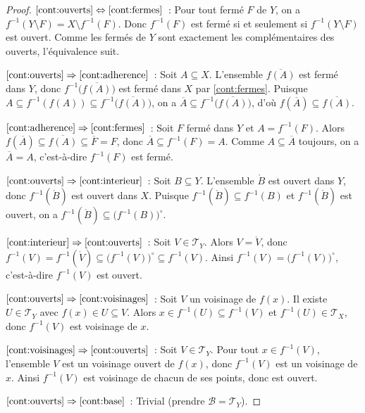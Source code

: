 \documentclass[12pt,a4paper,openany]{book}
\theoremstyle{definition}
\theoremstyle{cours}
\theoremstyle{coursnormal}
\newcommand{\T}{\mathcal{T}}
\newcommand{\B}{\mathcal{B}}
\begin{document}
\begin{proof}
  $\ref{cont:ouverts}\Leftrightarrow\ref{cont:fermes}$~: Pour tout fermé $F$
  de $Y$, on a $f^{-1}(Y\setminus F) = X\setminus f^{-1}(F)$. Donc
  $f^{-1}(F)$ est fermé si et seulement si $f^{-1}(Y\setminus F)$ est
  ouvert. Comme les fermés de $Y$ sont exactement les complémentaires des
  ouverts, l'équivalence suit.

  $\ref{cont:ouverts}\Rightarrow\ref{cont:adherence}$~: Soit $A\subseteq X$.
  L'ensemble $\overline{f(A)}$ est fermé dans $Y$, donc
  $f^{-1}\bigl(\overline{f(A)}\bigr)$ est fermé dans $X$ par
  \ref{cont:fermes}. Puisque $A\subseteq f^{-1}(f(A))\subseteq
  f^{-1}\bigl(\overline{f(A)}\bigr)$, on a
  $\overline{A}\subseteq f^{-1}\bigl(\overline{f(A)}\bigr)$, d'où
  $f(\overline{A})\subseteq\overline{f(A)}$.

  $\ref{cont:adherence}\Rightarrow\ref{cont:fermes}$~: Soit $F$ fermé dans
  $Y$ et $A=f^{-1}(F)$. Alors
  $f(\overline{A})\subseteq\overline{f(A)}\subseteq\overline{F}=F$, donc
  $\overline{A}\subseteq f^{-1}(F)=A$. Comme $A\subseteq\overline{A}$
  toujours, on a $\overline{A}=A$, c'est-à-dire $f^{-1}(F)$ est fermé.

  $\ref{cont:ouverts}\Rightarrow\ref{cont:interieur}$~: Soit $B\subseteq Y$.
  L'ensemble $\mathring{B}$ est ouvert dans $Y$, donc
  $f^{-1}(\mathring{B})$ est ouvert dans $X$. Puisque
  $f^{-1}(\mathring{B})\subseteq f^{-1}(B)$ et $f^{-1}(\mathring{B})$ est
  ouvert, on a
  $f^{-1}(\mathring{B})\subseteq\bigl(f^{-1}(B)\bigr)^{\circ}$.

  $\ref{cont:interieur}\Rightarrow\ref{cont:ouverts}$~: Soit $V\in\T_Y$.
  Alors $V=\mathring{V}$, donc
  $f^{-1}(V) = f^{-1}(\mathring{V})\subseteq\bigl(f^{-1}(V)\bigr)^{\circ}
  \subseteq f^{-1}(V)$. Ainsi
  $f^{-1}(V)=\bigl(f^{-1}(V)\bigr)^{\circ}$, c'est-à-dire $f^{-1}(V)$ est
  ouvert.

  $\ref{cont:ouverts}\Rightarrow\ref{cont:voisinages}$~: Soit $V$ un
  voisinage de $f(x)$. Il existe $U\in\T_Y$ avec
  $f(x)\in U\subseteq V$. Alors $x\in f^{-1}(U)\subseteq f^{-1}(V)$ et
  $f^{-1}(U)\in\T_X$, donc $f^{-1}(V)$ est voisinage de $x$.

  $\ref{cont:voisinages}\Rightarrow\ref{cont:ouverts}$~: Soit $V\in\T_Y$.
  Pour tout $x\in f^{-1}(V)$, l'ensemble $V$ est un voisinage ouvert de
  $f(x)$, donc $f^{-1}(V)$ est un voisinage de $x$. Ainsi $f^{-1}(V)$ est
  voisinage de chacun de ses points, donc est ouvert.

  $\ref{cont:ouverts}\Rightarrow\ref{cont:base}$~: Trivial (prendre
  $\B=\T_Y$).


\end{proof}
\end{document}
